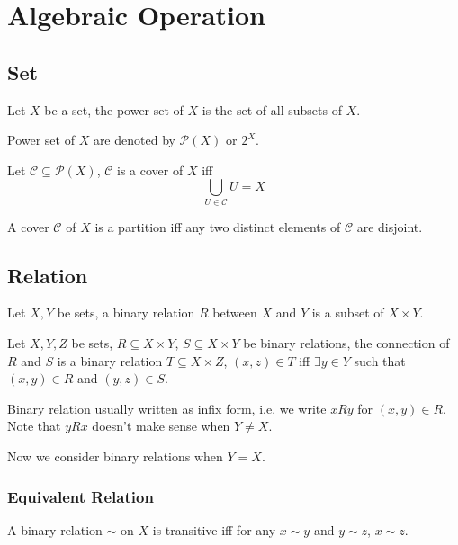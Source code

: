 \section{Algebraic Operation}

\subsection{Set}
\begin{defi}
Let $X$ be a set, the power set of $X$ is the set of all subsets of $X$.
\end{defi}

Power set of $X$ are denoted by $\mathcal P(X)$ or $2^X$.

\begin{defi}[cover]
Let $\mathcal C \subseteq \mathcal P(X)$, $\mathcal C$ is a cover of $X$ iff 
$$\bigcup_{U \in \mathcal C} U = X$$
\end{defi}

\begin{defi}[partition]
A cover $\mathcal C$ of $X$ is a partition iff any two distinct elements of $\mathcal C$
are disjoint.
\end{defi}

\subsection{Relation}
\begin{defi}
Let $X, Y$ be sets, a binary relation $R$ between $X$ and $Y$ is a subset of $X \times Y$.
\end{defi}

\begin{defi}[connection]
Let $X, Y, Z$ be sets, $R \subseteq X \times Y$, $S \subseteq X \times Y$ be binary relations,
the connection of $R$ and $S$ is a binary relation $T \subseteq X \times Z$,
$(x, z) \in T$ iff $\exists y \in Y$ such that $(x, y) \in R$ and $(y, z) \in S$.
\end{defi}

Binary relation usually written as infix form, i.e. we write $x R y$ for $(x, y) \in R$.
Note that $y R x$ doesn't make sense when $Y \neq X$.

Now we consider binary relations when $Y = X$.

\subsubsection{Equivalent Relation}
\begin{defi}[transitive]
A binary relation $\sim$ on $X$ is transitive iff for any $x \sim y$ and $y \sim z$,
$x \sim z$.
\end{defi}


